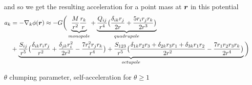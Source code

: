 and so we get the resulting acceleration for a point mass at $\boldsymbol{r}$ in this potential
\begin{align}
a_{k} &= - \nabla_{k} \phi(\boldsymbol{r}) \approx - G \bigg(
\underbrace{ \frac{M}{r^{2}} \frac{r_{k}}{r} }_{monopole}+ 
\underbrace{ \frac{Q_{i j}}{r^{4}}
\big( \frac{\delta_{i k} r_{j} }{2r} + \frac{5 r_{i} r_{j} r_{k} }{2r^{3}} \big)
}_{quadrupole} \nonumber \\
&+ \underbrace{ \frac{S_{i j}}{r^{5}}
\big( \frac{ \delta_{i k} r_{i} r_{j} }{r^{2}}
+ \frac{ \delta_{j k} r_{i}^{2} }{2 r^{2} }
- \frac{7 r_{i}^{2} r_{j} r_{k} }{r^{4} } \big) 
 + \frac{S_{1 2 3}}{r^{5} }
\big( \frac{\delta_{1 k} r_{2} r_{3} + \delta_{2 k} r_{3} r_{1} + \delta_{3 k} r_{1} r_{2}}{2 r^{2}} 
- \frac{7 r_{1} r_{2} r_{3} r_{k} }{2 r^{4}}\big) 
}_{octupole}
\bigg)
\end{align}

$\theta$ clumping parameter, self-acceleration for $\theta \ge 1$
\cite{1986Natur.324..446B}